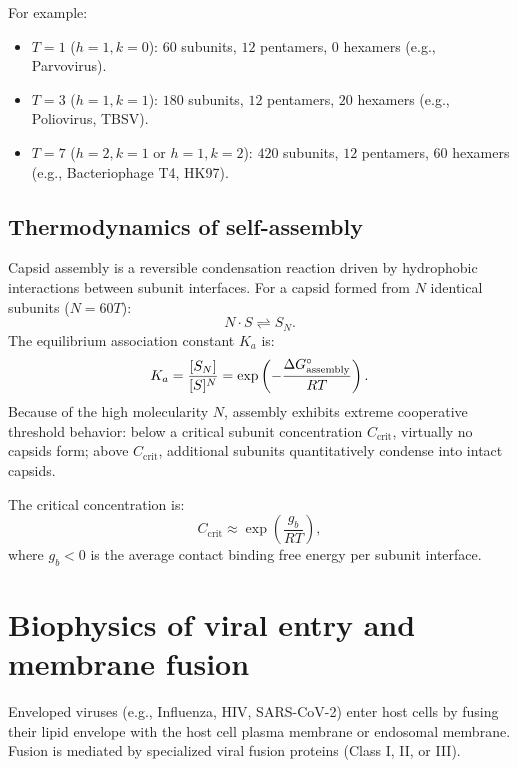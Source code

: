 \documentclass[12pt, a4paper, oneside]{report}
\begin{document}
For example:
\begin{itemize}
  \item $T=1$ ($h=1, k=0$): $60$ subunits, $12$ pentamers, $0$ hexamers (e.g., Parvovirus).
  \item $T=3$ ($h=1, k=1$): $180$ subunits, $12$ pentamers, $20$ hexamers (e.g., Poliovirus, TBSV).
  \item $T=7$ ($h=2, k=1$ or $h=1, k=2$): $420$ subunits, $12$ pentamers, $60$ hexamers (e.g., Bacteriophage T4, HK97).
\end{itemize}

\subsection{Thermodynamics of self-assembly}

Capsid assembly is a reversible condensation reaction driven by hydrophobic interactions between subunit interfaces. For a capsid formed from $N$ identical subunits ($N = 60T$):
\[
  N \cdot S \rightleftharpoons S_N.
\]
The equilibrium association constant $K_a$ is:
\begin{equation}
  K_a = \frac{[S_N]}{[S]^N} = \exp\left(-\frac{\Delta G^\circ_{\text{assembly}}}{RT}\right).
  \label{eq:assembly_ka}
\end{equation}
Because of the high molecularity $N$, assembly exhibits extreme cooperative threshold behavior: below a critical subunit concentration $C_{\text{crit}}$, virtually no capsids form; above $C_{\text{crit}}$, additional subunits quantitatively condense into intact capsids.

The critical concentration is:
\begin{equation}
  C_{\text{crit}} \approx \exp\left(\frac{g_b}{RT}\right),
  \label{eq:ccrit}
\end{equation}
where $g_b < 0$ is the average contact binding free energy per subunit interface.

\section{Biophysics of viral entry and membrane fusion}

Enveloped viruses (e.g., Influenza, HIV, SARS-CoV-2) enter host cells by fusing their lipid envelope with the host cell plasma membrane or endosomal membrane. Fusion is mediated by specialized viral fusion proteins (Class I, II, or III).
\end{document}
